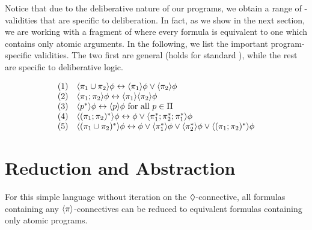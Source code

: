\documentclass{llncs}
\begin{document}
Notice that due to the deliberative nature of our programs, we obtain a range of -validities that are specific to deliberation. In fact, as we show in the next section, we are working with a fragment of  where every formula is equivalent to one which contains only atomic arguments. In the following, we list the important program-specific validities. The two first are general (holds for standard ), while the rest are specific to deliberative logic.

\begin{equation}\label{eq:val}
\begin{array}{ll}
(1) & \langle{\pi_1 \cup \pi_2}\rangle \phi \leftrightarrow \langle{\pi_1}\rangle \phi \lor \langle{\pi_2}\rangle \phi \\
(2) & \langle{\pi_1;\pi_2}\rangle \phi \leftrightarrow \langle{\pi_1}\rangle\langle{\pi_2}\rangle\phi \\
(3) & \langle{p^\ast}\rangle \phi \leftrightarrow \langle{p}\rangle \phi \text{ for all } p \in \Pi \\
(4) & \langle{(\pi_1;\pi_2)^\ast}\rangle \phi \leftrightarrow \phi \lor \langle{\pi_1^\ast;\pi_2^\ast;\pi_1^\ast}\rangle \phi \\
(5) & \langle{(\pi_1 \cup \pi_2)^\ast}\rangle \phi \leftrightarrow \phi \lor \langle{\pi_1^\ast}\rangle\phi \lor \langle{\pi_2^\ast}\rangle\phi \lor \langle{(\pi_1;\pi_2)^\ast}\rangle\phi \\
\end{array}
\end{equation}
\section{Reduction and Abstraction}\label{sec:abstraction}

For this simple language without iteration on the $\lozenge$-connective, all formulas containing any $\langle{\pi}\rangle$-connectives can be reduced to equivalent formulas containing only atomic programs. 
\end{document}
